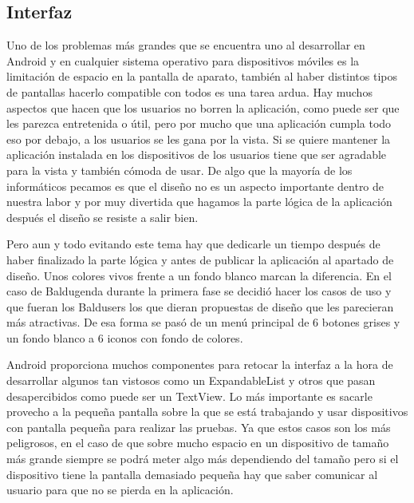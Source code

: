\subsection{Interfaz}
\label{subsecc:Interfaz}

Uno de los problemas más grandes que se encuentra uno al desarrollar en Android y en cualquier sistema operativo para dispositivos móviles es la limitación de espacio en la pantalla de aparato, también al haber distintos tipos de pantallas hacerlo compatible con todos es una tarea ardua.
Hay muchos aspectos que hacen que los usuarios no borren la aplicación, como puede ser que les parezca entretenida o útil, pero por mucho que una aplicación cumpla todo eso por debajo, a los usuarios se les gana por la vista. Si se quiere mantener la aplicación instalada en los dispositivos de los usuarios tiene que ser agradable para la vista y también cómoda de usar.
De algo que la mayoría de los informáticos pecamos es que el diseño no es un aspecto importante dentro de nuestra labor y por muy divertida que hagamos la parte lógica de la aplicación después el diseño se resiste a salir bien.

Pero aun y todo evitando este tema hay que dedicarle un tiempo después de haber finalizado la parte lógica y antes de publicar la aplicación al apartado de diseño.
Unos colores vivos frente a un fondo blanco marcan la diferencia.
En el caso de Baldugenda durante la primera fase se decidió hacer los casos de uso y que fueran los Baldusers los que dieran propuestas de diseño que les parecieran más atractivas.
De esa forma se pasó de un menú principal de 6 botones grises y un fondo blanco a 6 iconos con fondo de colores.

Android proporciona muchos componentes para retocar la interfaz a la hora de desarrollar algunos tan vistosos como un ExpandableList y otros que pasan desapercibidos como puede ser un TextView.
Lo más importante es sacarle provecho a la pequeña pantalla sobre la que se está trabajando y usar dispositivos con pantalla pequeña para realizar las pruebas. Ya que estos casos son los más peligrosos, en el caso de que sobre mucho espacio en un dispositivo de tamaño más grande siempre se podrá meter algo más dependiendo del tamaño pero si el dispositivo tiene la pantalla demasiado pequeña hay que saber comunicar al usuario para que no se pierda en la aplicación.

